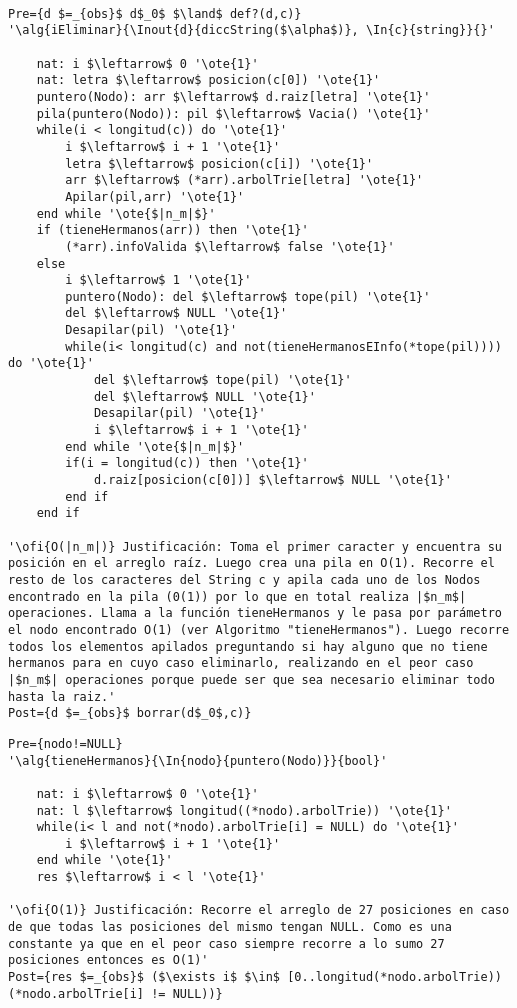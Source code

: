 \begin{lstlisting}[mathescape]

Pre={d $=_{obs}$ d$_0$ $\land$ def?(d,c)}
'\alg{iEliminar}{\Inout{d}{diccString($\alpha$)}, \In{c}{string}}{}'

	nat: i $\leftarrow$ 0 '\ote{1}'
	nat: letra $\leftarrow$ posicion(c[0]) '\ote{1}'
	puntero(Nodo): arr $\leftarrow$ d.raiz[letra] '\ote{1}'
	pila(puntero(Nodo)): pil $\leftarrow$ Vacia() '\ote{1}'
	while(i < longitud(c)) do '\ote{1}'
		i $\leftarrow$ i + 1 '\ote{1}'
		letra $\leftarrow$ posicion(c[i]) '\ote{1}'
		arr $\leftarrow$ (*arr).arbolTrie[letra] '\ote{1}'
		Apilar(pil,arr) '\ote{1}'
	end while '\ote{$|n_m|$}'
	if (tieneHermanos(arr)) then '\ote{1}'
		(*arr).infoValida $\leftarrow$ false '\ote{1}'
	else
		i $\leftarrow$ 1 '\ote{1}'
		puntero(Nodo): del $\leftarrow$ tope(pil) '\ote{1}'
		del $\leftarrow$ NULL '\ote{1}'
		Desapilar(pil) '\ote{1}'
		while(i< longitud(c) and not(tieneHermanosEInfo(*tope(pil)))) do '\ote{1}'
			del $\leftarrow$ tope(pil) '\ote{1}'
			del $\leftarrow$ NULL '\ote{1}'
			Desapilar(pil) '\ote{1}'
			i $\leftarrow$ i + 1 '\ote{1}'
		end while '\ote{$|n_m|$}'
		if(i = longitud(c)) then '\ote{1}'
			d.raiz[posicion(c[0])] $\leftarrow$ NULL '\ote{1}'
		end if
	end if

'\ofi{O(|n_m|)} Justificación: Toma el primer caracter y encuentra su posición en el arreglo raíz. Luego crea una pila en O(1). Recorre el resto de los caracteres del String c y apila cada uno de los Nodos encontrado en la pila (0(1)) por lo que en total realiza |$n_m$| operaciones. Llama a la función tieneHermanos y le pasa por parámetro el nodo encontrado O(1) (ver Algoritmo "tieneHermanos"). Luego recorre todos los elementos apilados preguntando si hay alguno que no tiene hermanos para en cuyo caso eliminarlo, realizando en el peor caso |$n_m$| operaciones porque puede ser que sea necesario eliminar todo hasta la raiz.'
Post={d $=_{obs}$ borrar(d$_0$,c)}

\end{lstlisting}

\begin{lstlisting}[mathescape]
Pre={nodo!=NULL}
'\alg{tieneHermanos}{\In{nodo}{puntero(Nodo)}}{bool}'

	nat: i $\leftarrow$ 0 '\ote{1}'
	nat: l $\leftarrow$ longitud((*nodo).arbolTrie)) '\ote{1}'
	while(i< l and not(*nodo).arbolTrie[i] = NULL) do '\ote{1}'
		i $\leftarrow$ i + 1 '\ote{1}'
	end while '\ote{1}' 
	res $\leftarrow$ i < l '\ote{1}'

'\ofi{O(1)} Justificación: Recorre el arreglo de 27 posiciones en caso de que todas las posiciones del mismo tengan NULL. Como es una constante ya que en el peor caso siempre recorre a lo sumo 27 posiciones entonces es O(1)'
Post={res $=_{obs}$ ($\exists i$ $\in$ [0..longitud(*nodo.arbolTrie)) (*nodo.arbolTrie[i] != NULL))}

\end{lstlisting}

